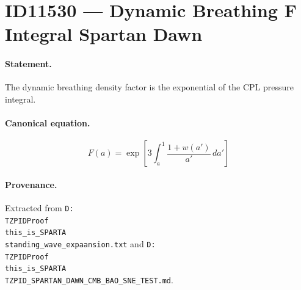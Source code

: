 \section*{ID11530 --- Dynamic Breathing F Integral Spartan Dawn}

\paragraph{Statement.}
The dynamic breathing density factor is the exponential of the CPL pressure integral.

\paragraph{Canonical equation.}
\[
F(a)=\exp\left[3\int_a^1\frac{1+w(a')}{a'}\,da'\right]
\]

\paragraph{Provenance.}
Extracted from \texttt{D:\\TZPIDProof\\this\_is\_SPARTA\\standing\_wave\_expaansion.txt} and \texttt{D:\\TZPIDProof\\this\_is\_SPARTA\\TZPID\_SPARTAN\_DAWN\_CMB\_BAO\_SNE\_TEST.md}.
